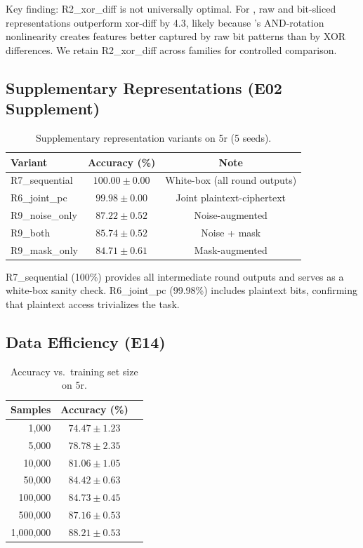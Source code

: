 Key finding: R2\_xor\_diff is not universally optimal.
For \simon, raw and bit-sliced representations outperform xor-diff by 4.3\pp, likely because \simon's AND-rotation nonlinearity creates features better captured by raw bit patterns than by XOR differences.
We retain R2\_xor\_diff across families for controlled comparison.

\FloatBarrier
\subsection{Supplementary Representations (E02 Supplement)}

\begin{table}[htbp]
\centering
\caption{Supplementary representation variants on \speck 5r (5 seeds).}
\label{tab:repr-supplement}
\begin{tabular}{@{}lcc@{}}
\toprule
\textbf{Variant} & \textbf{Accuracy (\%)} & \textbf{Note} \\
\midrule
R7\_sequential     & $100.00 \pm 0.00$ & White-box (all round outputs) \\
R6\_joint\_pc      & $99.98 \pm 0.00$  & Joint plaintext-ciphertext \\
R9\_noise\_only    & $87.22 \pm 0.52$  & Noise-augmented \\
R9\_both           & $85.74 \pm 0.52$  & Noise + mask \\
R9\_mask\_only     & $84.71 \pm 0.61$  & Mask-augmented \\
\bottomrule
\end{tabular}
\end{table}

R7\_sequential (100\%) provides all intermediate round outputs and serves as a white-box sanity check.
R6\_joint\_pc (99.98\%) includes plaintext bits, confirming that plaintext access trivializes the task.

\FloatBarrier
\subsection{Data Efficiency (E14)}

\begin{table}[htbp]
\centering
\caption{Accuracy vs.\ training set size on \speck 5r.}
\label{tab:data-efficiency}
\begin{tabular}{@{}rcc@{}}
\toprule
\textbf{Samples} & \textbf{Accuracy (\%)} \\
\midrule
1,000     & $74.47 \pm 1.23$ \\
5,000     & $78.78 \pm 2.35$ \\
10,000    & $81.06 \pm 1.05$ \\
50,000    & $84.42 \pm 0.63$ \\
100,000   & $84.73 \pm 0.45$ \\
500,000   & $87.16 \pm 0.53$ \\
1,000,000 & $88.21 \pm 0.53$ \\
\bottomrule
\end{tabular}
\end{table}

